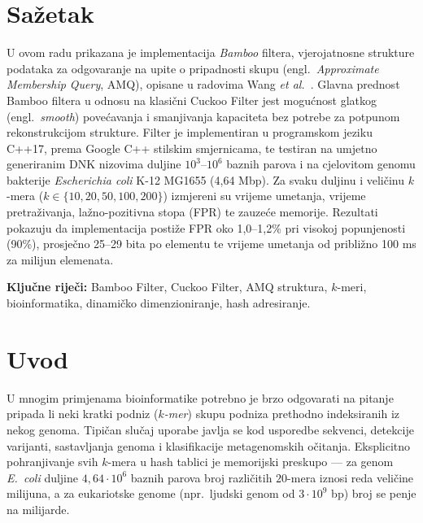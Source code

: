 \documentclass[12pt,a4paper]{article}
\begin{document}
\section*{Sažetak}
U ovom radu prikazana je implementacija \textit{Bamboo} filtera, vjerojatnosne strukture
podataka za odgovaranje na upite o pripadnosti skupu (engl.~\textit{Approximate
Membership Query}, AMQ), opisane u radovima Wang \textit{et al.}~\cite{wang2022bamboo,
wang2024bamboo}. Glavna prednost Bamboo filtera u odnosu na klasični Cuckoo Filter
\cite{fan2014cuckoo} jest mogućnost glatkog (engl.~\textit{smooth}) povećavanja i
smanjivanja kapaciteta bez potrebe za potpunom rekonstrukcijom strukture. Filter je
implementiran u programskom jeziku C++17, prema Google C++ stilskim smjernicama, te
testiran na umjetno generiranim DNK nizovima duljine $10^3$--$10^6$ baznih parova i
na cjelovitom genomu bakterije \textit{Escherichia coli} K-12 MG1655 (4{,}64 Mbp). Za
svaku duljinu i veličinu $k$-mera ($k \in \{10, 20, 50, 100, 200\}$) izmjereni su
vrijeme umetanja, vrijeme pretraživanja, lažno-pozitivna stopa (FPR) te zauzeće
memorije. Rezultati pokazuju da implementacija postiže FPR oko 1{,}0--1{,}2\% pri
visokoj popunjenosti (90\%), prosječno 25--29 bita po elementu te vrijeme umetanja
od približno 100 ms za milijun elemenata.

\vspace{1em}
\noindent\textbf{Ključne riječi:} Bamboo Filter, Cuckoo Filter, AMQ struktura, $k$-meri,
bioinformatika, dinamičko dimenzioniranje, hash adresiranje.

\newpage
\tableofcontents
\newpage
\setcounter{page}{1}

\section{Uvod}

U mnogim primjenama bioinformatike potrebno je brzo odgovarati na pitanje pripada li
neki kratki podniz (\emph{$k$-mer}) skupu podniza prethodno indeksiranih iz nekog
genoma. Tipičan slučaj uporabe javlja se kod usporedbe sekvenci, detekcije varijanti,
sastavljanja genoma i klasifikacije metagenomskih očitanja. Eksplicitno pohranjivanje
svih $k$-mera u hash tablici je memorijski preskupo --- za genom \textit{E.~coli}
duljine $4{,}64 \cdot 10^6$ baznih parova broj različitih $20$-mera iznosi reda
veličine milijuna, a za eukariotske genome (npr.~ljudski genom od $3 \cdot 10^9$ bp)
broj se penje na milijarde.
\end{document}
